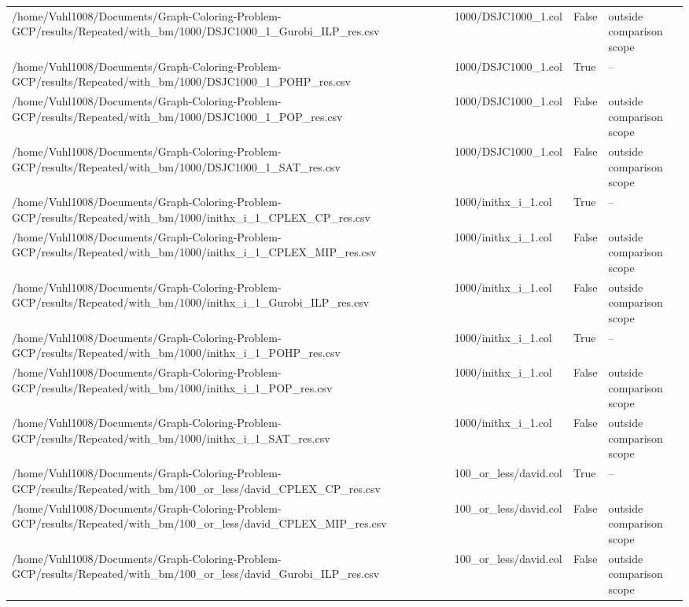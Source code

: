 \begin{table}[htbp]
\begin{tabular}{llll}
/home/Vuhl1008/Documents/Graph-Coloring-Problem-GCP/results/Repeated/with\_bm/1000/DSJC1000\_1\_Gurobi\_ILP\_res.csv & 1000/DSJC1000\_1.col & False & outside comparison scope \\
/home/Vuhl1008/Documents/Graph-Coloring-Problem-GCP/results/Repeated/with\_bm/1000/DSJC1000\_1\_POHP\_res.csv & 1000/DSJC1000\_1.col & True & -- \\
/home/Vuhl1008/Documents/Graph-Coloring-Problem-GCP/results/Repeated/with\_bm/1000/DSJC1000\_1\_POP\_res.csv & 1000/DSJC1000\_1.col & False & outside comparison scope \\
/home/Vuhl1008/Documents/Graph-Coloring-Problem-GCP/results/Repeated/with\_bm/1000/DSJC1000\_1\_SAT\_res.csv & 1000/DSJC1000\_1.col & False & outside comparison scope \\
/home/Vuhl1008/Documents/Graph-Coloring-Problem-GCP/results/Repeated/with\_bm/1000/inithx\_i\_1\_CPLEX\_CP\_res.csv & 1000/inithx\_i\_1.col & True & -- \\
/home/Vuhl1008/Documents/Graph-Coloring-Problem-GCP/results/Repeated/with\_bm/1000/inithx\_i\_1\_CPLEX\_MIP\_res.csv & 1000/inithx\_i\_1.col & False & outside comparison scope \\
/home/Vuhl1008/Documents/Graph-Coloring-Problem-GCP/results/Repeated/with\_bm/1000/inithx\_i\_1\_Gurobi\_ILP\_res.csv & 1000/inithx\_i\_1.col & False & outside comparison scope \\
/home/Vuhl1008/Documents/Graph-Coloring-Problem-GCP/results/Repeated/with\_bm/1000/inithx\_i\_1\_POHP\_res.csv & 1000/inithx\_i\_1.col & True & -- \\
/home/Vuhl1008/Documents/Graph-Coloring-Problem-GCP/results/Repeated/with\_bm/1000/inithx\_i\_1\_POP\_res.csv & 1000/inithx\_i\_1.col & False & outside comparison scope \\
/home/Vuhl1008/Documents/Graph-Coloring-Problem-GCP/results/Repeated/with\_bm/1000/inithx\_i\_1\_SAT\_res.csv & 1000/inithx\_i\_1.col & False & outside comparison scope \\
/home/Vuhl1008/Documents/Graph-Coloring-Problem-GCP/results/Repeated/with\_bm/100\_or\_less/david\_CPLEX\_CP\_res.csv & 100\_or\_less/david.col & True & -- \\
/home/Vuhl1008/Documents/Graph-Coloring-Problem-GCP/results/Repeated/with\_bm/100\_or\_less/david\_CPLEX\_MIP\_res.csv & 100\_or\_less/david.col & False & outside comparison scope \\
/home/Vuhl1008/Documents/Graph-Coloring-Problem-GCP/results/Repeated/with\_bm/100\_or\_less/david\_Gurobi\_ILP\_res.csv & 100\_or\_less/david.col & False & outside comparison scope \\

\end{tabular}
\end{table}

